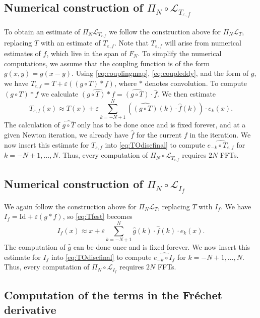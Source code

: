 \documentclass[12pt]{article}
\def\L{\mathcal{L}}
\newcommand{\eps}{\varepsilon}
\theoremstyle{plain}
\begin{document}
{\subsection{Numerical construction of $\Pi_N\circ\L_{T_{\eps,f}}$}
\label{sec:LTf}

To obtain an estimate of $\Pi_N\L_{T_{\eps,f}}$ we follow the construction above for $\Pi_N\L_{T}$, replacing $T$ with an estimate of $T_{\eps,f}$.
Note that $T_{\eps,f}$ will arise from numerical estimates of $f$, which live in the span of $F_N$.
To simplify the numerical computations, we assume that the coupling function is of the form $g(x,y)=g(x-y)$.
Using \eqref{eq:couplingmap}, \eqref{eq:coupleddy}, and the form of $g$, we have $T_{\eps,f} = T + \eps((g\circ T)\ast f)$, where $\ast$ denotes convolution.
To compute $(g\circ T)\ast f$ we calculate $\widehat{(g\circ T)\ast f}=\widehat{(g\circ T)}\cdot\hat{f}$. 
We then estimate 
\begin{equation}
    \label{eq:Tfest}
T_{\eps,f}(x)\approx T(x) + \eps\sum_{k=-N+1}^{N}\left(\widehat{(g\circ T)}(k)\cdot\hat{f}(k)\right)\cdot e_k(x).
\end{equation}
The calculation of $\widehat{g\circ T}$ only has to be done once and is fixed forever, and at a given Newton iteration, we already have $\hat{f}$ for the current $f$ in the iteration.
We now insert this estimate for $T_{\eps,f}$ 
into \eqref{eq:TOdiscfinal} to compute $\widehat{e_{-k}\circ T_{\eps,f}}$ for $k=-N+1,\ldots, N$.
Thus, every computation of $\Pi_N\circ\L_{T_{\eps,f}}$ requires $2N$ FFTs.

\subsection{Numerical construction of $\Pi_N\circ\L_{I_f}$}

We again follow the construction above for $\Pi_N\L_{T}$, replacing $T$ with $I_f$.
We have $I_f = \mathrm{Id} + \eps(g\ast f)$, so \eqref{eq:Tfest} becomes
\begin{equation}
    \label{eq:Ifest}
I_{f}(x)\approx x + \eps\sum_{k=-N+1}^{N}\hat{g}(k)\cdot\hat{f}(k)\cdot e_k(x).
\end{equation}
The computation of $\hat g$ can be done once and is fixed forever.
We now insert this estimate for $I_{f}$ 
into \eqref{eq:TOdiscfinal} to compute $\widehat{e_{-k}\circ I_{f}}$ for $k=-N+1,\ldots, N$.
Thus, every computation of $\Pi_N\circ\L_{I_{f}}$ requires $2N$ FFTs.

\subsection{Computation of the terms in the Fr\'echet derivative}

}
\end{document}

